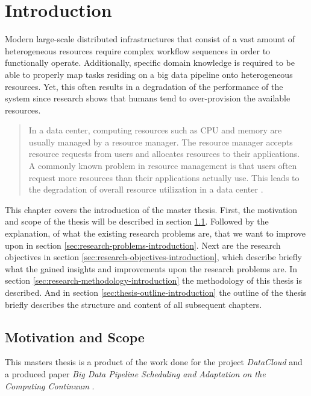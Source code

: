 \chapter{Introduction}
\label{ch:introduction}

    Modern large-scale distributed infrastructures that consist of a vast amount of heterogeneous resources require complex workflow sequences in order to functionally operate. Additionally, specific domain knowledge is required to be able to properly map tasks residing on a big data pipeline onto heterogeneous resources. Yet, this often results in a degradation of the performance of the system since research shows that humans tend to over-provision the available resources.

    \begin{quote}
        In a data center, computing resources such as CPU and memory are usually managed by a resource manager. The resource manager accepts resource requests from users and allocates resources to their applications. A commonly known problem in resource management is that users often request more resources than their applications actually use. This leads to the degradation of overall resource utilization in a data center \cite{thonglekImprovingResourceUtilization2019}.
    \end{quote}

    This chapter covers the introduction of the master thesis.
    First, the motivation and scope of the thesis will be described in section \ref{sec:motivation-and-scope-introduction}.
    Followed by the explanation, of what the existing research problems are, that we want to improve upon in section \ref{sec:research-problems-introduction}. Next are the research objectives in section \ref{sec:research-objectives-introduction}, which describe briefly what the gained insights and improvements upon the research problems are. In section \ref{sec:research-methodology-introduction} the methodology of this thesis is described. And in section \ref{sec:thesis-outline-introduction} the outline of the thesis briefly describes the structure and content of all subsequent chapters.

        \section{Motivation and Scope}
        \label{sec:motivation-and-scope-introduction}

            This masters thesis is a product of the work done for the project \emph{DataCloud} and a produced paper \emph{Big Data Pipeline Scheduling and Adaptation on the Computing Continuum} \cite{kimovskiBigDataPipeline2022}.

